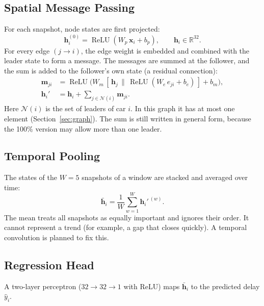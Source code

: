 \documentclass[11pt,a4paper]{article}
\begin{document}
\subsection{Spatial Message Passing}
For each snapshot, node states are first projected:
\begin{equation}
\mathbf{h}_i^{(0)} = \operatorname{ReLU}(W_p\,\mathbf{x}_i + b_p), \qquad \mathbf{h}_i \in \mathbb{R}^{32}.
\end{equation}
For every edge $(j \rightarrow i)$, the edge weight is embedded and combined with
the leader state to form a message. The messages are summed at the follower,
and the sum is added to the follower's own state (a residual connection):
\begin{align}
\mathbf{m}_{ji} &= \operatorname{ReLU}\!\bigl(W_m\,[\,\mathbf{h}_j \,\|\, \operatorname{ReLU}(W_e\, e_{ji} + b_e)\,] + b_m\bigr),\\
\mathbf{h}_i' &= \mathbf{h}_i + \sum_{j \in \mathcal{N}(i)} \mathbf{m}_{ji}.
\end{align}
Here $\mathcal{N}(i)$ is the set of leaders of car $i$. In this graph it has at
most one element (Section~\ref{sec:graph}). The sum is still written in general
form, because the 100\% version may allow more than one leader.

\subsection{Temporal Pooling}
The states of the $W = 5$ snapshots of a window are stacked and averaged over time:
\begin{equation}
\bar{\mathbf{h}}_i = \frac{1}{W}\sum_{w=1}^{W} \mathbf{h}_i'^{\,(w)}.
\end{equation}
The mean treats all snapshots as equally important and ignores their order.
It cannot represent a trend (for example, a gap that closes quickly). A
temporal convolution is planned to fix this.

\subsection{Regression Head}
A two-layer perceptron ($32 \rightarrow 32 \rightarrow 1$ with ReLU) maps
$\bar{\mathbf{h}}_i$ to the predicted delay $\hat{y}_i$.
\end{document}
